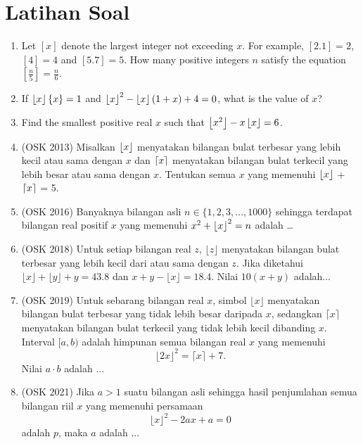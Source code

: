 \documentclass[11pt]{scrartcl}
\begin{document}
\section{Latihan Soal}
\begin{enumerate}
    \item Let $[x]$ denote the largest integer not exceeding $x$. For example, $[2.1]=2$, $[4]=4$ and $[5.7]=5$. How many positive integers $n$ satisfy the equation $\left[\frac{n}{5}\right]=\frac{n}{6}$.

    \item If $\left\lfloor x \right\rfloor\{x\} = 1$ and $\left\lfloor x \right\rfloor^2-\left\lfloor x \right\rfloor(1+x)+4=0$, what is the value of $x$?

    \item Find the smallest positive real $x$ such that $\left\lfloor x^2 \right\rfloor-x\left\lfloor x \right\rfloor=6$. 
    
    \item (OSK 2013) Misalkan $\left\lfloor x \right\rfloor$ menyatakan bilangan bulat terbesar yang lebih kecil atau sama dengan $x$ dan $\left\lceil x \right\rceil$ menyatakan bilangan bulat terkecil yang lebih besar atau sama dengan $x$. Tentukan semua $x$ yang memenuhi $\left\lfloor x \right\rfloor$ + $\left\lceil x \right\rceil$ = 5.
    
    \item (OSK 2016) Banyaknya bilangan asli $n \in \{1,2,3,\dots,1000\}$ sehingga terdapat bilangan real positif $x$ yang memenuhi $x^2+\left\lfloor x \right\rfloor^2=n$ adalah \dots
    
    \item (OSK 2018) Untuk setiap bilangan real $z$, $\lfloor z \rfloor$ menyatakan bilangan bulat terbesar yang lebih kecil dari atau sama dengan $z$. Jika diketahui $\lfloor x \rfloor + \lfloor y \rfloor + y = 43.8$ dan $x + y - \lfloor x \rfloor = 18.4$. Nilai $10(x + y)$ adalah...

    \item (OSK 2019) Untuk sebarang bilangan real $x$, simbol $\lfloor x \rfloor$ menyatakan bilangan bulat terbesar yang tidak lebih besar daripada $x$, sedangkan $\lceil x \rceil$ menyatakan bilangan bulat terkecil yang tidak lebih kecil dibanding $x$. Interval $[a, b)$ adalah himpunan semua bilangan real $x$ yang memenuhi
    $$\lfloor 2x \rfloor^2 = \lceil x \rceil + 7.$$
    Nilai $a \cdot b$ adalah ...

    \item (OSK 2021) Jika $a > 1$ suatu bilangan asli sehingga hasil penjumlahan semua bilangan riil $x$ yang memenuhi persamaan
    $$\lfloor x \rfloor^2 - 2ax + a = 0$$
    adalah $p$, maka $a$ adalah ...


\end{enumerate}
\end{document}
